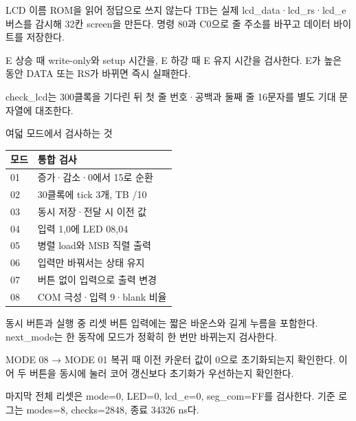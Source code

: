 \begin{frame}{LCD 이름 ROM을 읽어 정답으로 쓰지 않는다}
\small
TB는 실제 lcd\_data·lcd\_rs·lcd\_e 버스를 감시해 32칸 screen을 만든다. 명령 80과 C0으로 줄 주소를 바꾸고 데이터 바이트를 저장한다.\par\vspace{0.26cm}E 상승 때 write-only와 setup 시간을, E 하강 때 E 유지 시간을 검사한다. E가 높은 동안 DATA 또는 RS가 바뀌면 즉시 실패한다.\par\vspace{0.26cm}check\_lcd는 300클록을 기다린 뒤 첫 줄 번호·공백과 둘째 줄 16문자를 별도 기대 문자열에 대조한다.\par
\end{frame}

\begin{frame}{여덟 모드에서 검사하는 것}
\small
\begin{center}\renewcommand{\arraystretch}{1.55}\begin{tabular}{ll}
모드 & 통합 검사\\\hline
01 & 증가·감소·0에서 15로 순환\\
02 & 30클록에 tick 3개, TB /10\\
03 & 동시 저장·전달 시 이전 값\\
04 & 입력 1,0에 LED 08,04\\
05 & 병렬 load와 MSB 직렬 출력\\
06 & 입력만 바꿔서는 상태 유지\\
07 & 버튼 없이 입력으로 출력 변경\\
08 & COM 극성·입력 9·blank 비율\\
\end{tabular}\end{center}
\end{frame}

\begin{frame}{동시 버튼과 실행 중 리셋}
\small
버튼 입력에는 짧은 바운스와 길게 누름을 포함한다. next\_mode는 한 동작에 모드가 정확히 한 번만 바뀌는지 검사한다.\par\vspace{0.26cm}MODE 08 → MODE 01 복귀 때 이전 카운터 값이 0으로 초기화되는지 확인한다. 이어 두 버튼을 동시에 눌러 코어 갱신보다 초기화가 우선하는지 확인한다.\par\vspace{0.26cm}마지막 전체 리셋은 mode=0, LED=0, lcd\_e=0, seg\_com=FF를 검사한다. 기준 로그는 modes=8, checks=2848, 종료 34326 ns다.\par
\end{frame}


